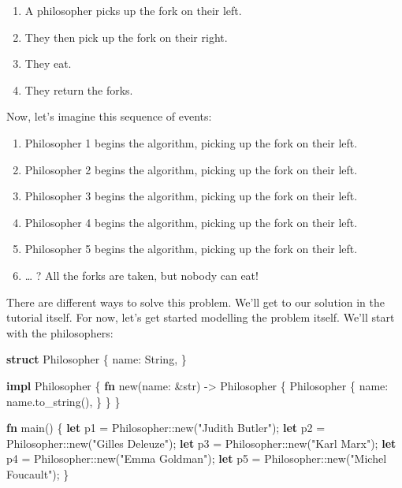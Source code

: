 \documentclass[a4paper,]{book}
\newenvironment{Shaded}{\begin{snugshade}}{\end{snugshade}}
\newcommand{\KeywordTok}[1]{\textcolor[rgb]{0.13,0.29,0.53}{\textbf{{#1}}}}
\newcommand{\DataTypeTok}[1]{\textcolor[rgb]{0.13,0.29,0.53}{{#1}}}
\newcommand{\StringTok}[1]{\textcolor[rgb]{0.31,0.60,0.02}{{#1}}}
\newcommand{\NormalTok}[1]{{#1}}
\providecommand{\tightlist}{%
  \setlength{\itemsep}{0pt}\setlength{\parskip}{0pt}}
\begin{document}
\begin{enumerate}
\def\labelenumi{\arabic{enumi}.}
\tightlist
\item
  A philosopher picks up the fork on their left.
\item
  They then pick up the fork on their right.
\item
  They eat.
\item
  They return the forks.
\end{enumerate}

Now, let's imagine this sequence of events:

\begin{enumerate}
\def\labelenumi{\arabic{enumi}.}
\tightlist
\item
  Philosopher 1 begins the algorithm, picking up the fork on their left.
\item
  Philosopher 2 begins the algorithm, picking up the fork on their left.
\item
  Philosopher 3 begins the algorithm, picking up the fork on their left.
\item
  Philosopher 4 begins the algorithm, picking up the fork on their left.
\item
  Philosopher 5 begins the algorithm, picking up the fork on their left.
\item
  \ldots{} ? All the forks are taken, but nobody can eat!
\end{enumerate}

There are different ways to solve this problem. We'll get to our
solution in the tutorial itself. For now, let's get started modelling
the problem itself. We'll start with the philosophers:

\begin{Shaded}
\begin{Highlighting}[]
\KeywordTok{struct} \NormalTok{Philosopher \{}
    \NormalTok{name: }\DataTypeTok{String}\NormalTok{,}
\NormalTok{\}}

\KeywordTok{impl} \NormalTok{Philosopher \{}
    \KeywordTok{fn} \NormalTok{new(name: &}\DataTypeTok{str}\NormalTok{) -> Philosopher \{}
        \NormalTok{Philosopher \{}
            \NormalTok{name: name.to_string(),}
        \NormalTok{\}}
    \NormalTok{\}}
\NormalTok{\}}

\KeywordTok{fn} \NormalTok{main() \{}
    \KeywordTok{let} \NormalTok{p1 = Philosopher::new(}\StringTok{"Judith Butler"}\NormalTok{);}
    \KeywordTok{let} \NormalTok{p2 = Philosopher::new(}\StringTok{"Gilles Deleuze"}\NormalTok{);}
    \KeywordTok{let} \NormalTok{p3 = Philosopher::new(}\StringTok{"Karl Marx"}\NormalTok{);}
    \KeywordTok{let} \NormalTok{p4 = Philosopher::new(}\StringTok{"Emma Goldman"}\NormalTok{);}
    \KeywordTok{let} \NormalTok{p5 = Philosopher::new(}\StringTok{"Michel Foucault"}\NormalTok{);}
\NormalTok{\}}
\end{Highlighting}
\end{Shaded}
\end{document}
